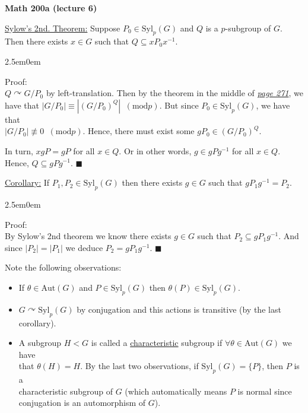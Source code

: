 \documentclass{book}
\newcommand{\inLinkRap}[2]{{\color{blue}\hyperlink{#1}{\textit{#2}}}}
\newcommand{\hTwo}{%
\color{Black}%
   \fontsize{13}{15}\selectfont%
}
\newcommand{\exTwo}{%
   \color{Purple}%
   \fontsize{13}{15}\selectfont%
}
\newcommand{\exThreeP}{%
   \color{RedViolet}%
   \fontsize{12}{14}\selectfont%
}
\newenvironment{myIndent}{%
   \begin{adjustwidth}{2.5em}{0em}%
}{%
   \end{adjustwidth}%
}
\newcommand{\udefine}[1]{{%
   \setulcolor{Red}%
   \setul{0.14em}{0.07em}%
   \ul{#1}%
}}
\newcommand{\blect}[1]{{\color{MidnightBlue}\textbf{#1}}}
\newcommand{\Aut}{\mathrm{Aut}}
\newcommand{\mMod}[1]{\phantom{a}(\mathrel{\mathrm{mod}} #1)}
\newcommand{\Syl}{\mathrm{Syl}}
\newcommand{\retTwo}{\hfill\bigbreak}
\begin{document}
\setul{0.14em}{0.07em}
\calibri

\hTwo \hypertarget{math 200a lecture 6}{\blect{Math 200a (lecture 6)}}\retTwo

\exTwo\ul{Sylow's 2nd. Theorem:} Suppose $P_0 \in \Syl_p(G)$ and $Q$ is a $p$-subgroup of $G$. Then there exists $x \in G$ such that $Q \subseteq xP_0 x^{-1}$.

\begin{myIndent}\exThreeP
	Proof:\\
	$Q \curvearrowright G / P_0$ by left-translation. Then by the theorem in the middle of \inLinkRap{Alireza theorem page 271}{page 271}, we\\ have that $|G / P_0| \equiv |(G/P_0)^Q| \mMod{p}$. But since $P_0 \in \Syl_p(G)$, we have that\\ $|G/P_0| \not\equiv 0 \mMod{p}$. Hence, there must exist some $gP_0 \in (G / P_0)^Q$.\retTwo

	In turn, $xgP = gP$ for all $x \in Q$. Or in other words, $g \in gPg^{-1}$ for all $x \in Q$. Hence, $Q \subseteq gPg^{-1}$. $\blacksquare$\retTwo
\end{myIndent}

\ul{Corollary:} If $P_1, P_2 \in \Syl_p(G)$ then there exists $g \in G$ such that $gP_1g^{-1} = P_2$.

\begin{myIndent}\exThreeP
	Proof:\\
	By Sylow's 2nd theorem we know there exists $g \in G$ such that $P_2 \subseteq gP_1g^{-1}$. And since $|P_2| = |P_1|$ we deduce $P_2 = gP_1g^{-1}$. $\blacksquare$\retTwo
\end{myIndent}

\hTwo Note the following observations:\\ [-20pt]
\begin{itemize}
	\item If $\theta \in \Aut(G)$ and $P \in \Syl_p(G)$ then $\theta(P) \in \Syl_p(G)$.
	\item $G \curvearrowright \Syl_p(G)$ by conjugation and this actions is transitive (by the last corollary).
	\item A subgroup $H < G$ is called a \udefine{characteristic} subgroup if $\forall \theta \in \Aut(G)$ we have\\ that $\theta(H) = H$. By the last two observations, if $\Syl_p(G) = \{P\}$, then $P$ is a\\ characteristic subgroup of $G$ {\color{BrickRed}(which automatically means $P$ is normal since\\ conjugation is an automorphism of $G$)}.\retTwo
\end{itemize}
\end{document}
